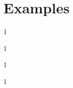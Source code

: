 \documentclass[10pt]{article}
\begin{document}
\section{Examples}
\begin{example}
    1
\end{example}

\begin{example}
    1
\end{example}

\begin{example}
    1
\end{example}

\begin{example}
    1
\end{example}

\clearpage


\end{document}
